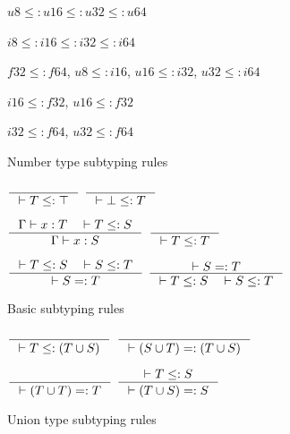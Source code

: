\documentclass[acmsmall,nonacm]{acmart}\settopmatter{printfolios=true,printccs=false,printacmref=false}
\begin{document}
\noindent
\begin{minipage}{0.5\textwidth}
\begin{figure}[H]
  \centering
$u8 \leq: u16 \leq: u32 \leq: u64$\par
\vspace*{2mm}
$i8 \leq: i16 \leq: i32 \leq: i64$\par
\vspace*{2mm}
$f32 \leq: f64$, $u8 \leq: i16$, $u16 \leq: i32$, $u32 \leq: i64$\par
\vspace*{2mm}
$i16 \leq: f32$, $u16 \leq: f32$\par
\vspace*{2mm}
$i32 \leq: f64$, $u32 \leq: f64$
\caption*{Number type subtyping rules}
\end{figure}
\end{minipage}
\begin{minipage}{0.5\textwidth}
  \centering
\begin{figure}[H]
$\inference {} {|- T \leq: \top}$ \hspace*{10mm} $\inference {} {|- \bot \leq: T}$\par
\vspace*{4mm}
$\inference {\Gamma |- x: T \quad |- T \leq: S}{\Gamma |- x: S}$ \hspace*{4mm}
$\inference {}{|- T \leq: T}$\par
\vspace*{4mm}
$\inference {|- T \leq: S \quad |- S \leq: T}{|- S =: T}$
$\inference {|- S =: T}{|- T \leq: S \quad |- S \leq: T}$
\caption*{Basic subtyping rules}
\end{figure}
\end{minipage}
\begin{minipage}{0.5\textwidth}
\begin{figure}[H]
  \centering
\vspace*{5mm}
$\inference {}{|- T \leq: (T \cup S)}$\hspace*{2mm}
$\inference {}{|- (S \cup T) =: (T \cup S)}$\par
\vspace*{4mm}
$\inference {}{|- (T \cup T) =: T}$\hspace*{2mm}
$\inference {|- T \leq: S}{|- (T \cup S) =: S}$
\caption*{Union type subtyping rules}
\end{figure}
\end{minipage}
\end{document}
